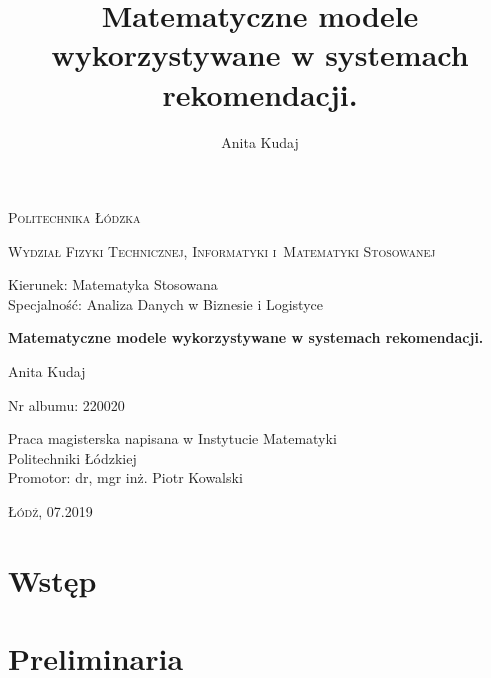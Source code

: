 \documentclass[12pt,a4paper]{report}
\author{Anita Kudaj}
\title{Matematyczne modele wykorzystywane w systemach rekomendacji.}
\begin{document}
\begin{titlepage}
\begin{flushleft}
\end{flushleft}
\begin{center}
\textsc{{\huge Politechnika Łódzka}}
\end{center}
\bigskip
\bigskip
\begin{center}
\textsc{{\Large Wydział Fizyki Technicznej, Informatyki i~Matematyki Stosowanej}}
\end{center}
\bigskip
\bigskip
\begin{Large}
Kierunek: Matematyka Stosowana
\\Specjalność: Analiza Danych w Biznesie i Logistyce

\end{Large}
\bigskip
\bigskip
\noindent\hrulefill
\begin{center}
{\textbf{{\Large Matematyczne modele wykorzystywane w systemach rekomendacji.}}}
\end{center}
\begin{flushright}
{\large 
Anita Kudaj

Nr albumu: 
220020
}
\end{flushright}
\noindent\hrulefill
\bigskip
\bigskip
\begin{center}
{\large Praca magisterska
napisana w Instytucie Matematyki 
\\Politechniki Łódzkiej 
\bigskip
\bigskip
\\Promotor: dr, mgr inż. Piotr Kowalski
 }
\end{center}
\bigskip
\bigskip
\bigskip
\bigskip
\begin{center}
{\textsc{\large Łódź, 07.2019}}
\end{center}
\end{titlepage}


\tableofcontents


\chapter{Wstęp}
\chapter{Preliminaria} 
\end{document}
